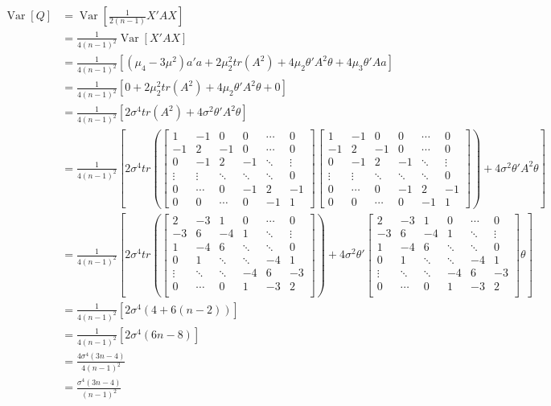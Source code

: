 \documentclass{article}
\newcommand{\Var}{\operatorname{Var}} %
\begin{document}
\begin{align*}
\Var[Q]&= \Var[\frac{1}{2(n-1)}X'AX] \\
&= \frac{1}{4(n-1)^2} \Var[X'AX]\\
&=  \frac{1}{4(n-1)^2} [(\mu_4-3\mu^2) a'a + 2\mu_2^2 tr(A^2) + 4\mu_2 \theta'A^2 \theta + 4\mu_3\theta'Aa] \\
&=  \frac{1}{4(n-1)^2} [0 +  2\mu_2^2 tr(A^2) + 4\mu_2 \theta'A^2 \theta + 0] \\
&=  \frac{1}{4(n-1)^2} [ 2\sigma^4 tr(A^2) + 4\sigma^2 \theta'A^2 \theta] \\
&=  \frac{1}{4(n-1)^2} [ 2\sigma^4 tr(  \begin{bmatrix}
1 & -1 & 0 & 0 & \cdots & 0 \\
-1 & 2 & -1 & 0 & \cdots&0 \\
0 & -1 & 2 & -1 & \ddots &\vdots \\
\vdots & \vdots & \ddots&\ddots &\ddots& 0\\
0&  \cdots & 0 &-1&2&-1 \\
0 & 0& \cdots & 0 & -1&1
\end{bmatrix} \begin{bmatrix}
1 & -1 & 0 & 0 & \cdots & 0 \\
-1 & 2 & -1 & 0 & \cdots&0 \\
0 & -1 & 2 & -1 & \ddots &\vdots \\
\vdots & \vdots & \ddots&\ddots &\ddots& 0\\
0&  \cdots & 0 &-1&2&-1 \\
0 & 0& \cdots & 0 & -1&1
\end{bmatrix})+ 4\sigma^2 \theta'A^2 \theta] \\
&= \frac{1}{4(n-1)^2} [ 2\sigma^4 tr(
\begin{bmatrix}
 2 & -3 & 1 & 0 & \cdots & 0 \\
 -3 & 6 & -4 & 1 & \ddots & \vdots \\
 1 & -4 & 6 & \ddots & \ddots & 0 \\
 0 & 1 & \ddots & \ddots& -4 & 1 \\
 \vdots & \ddots & \ddots & -4 & 6 & -3 \\
 0 & \cdots & 0 & 1 & -3 & 2 \\
\end{bmatrix})+ 4\sigma^2 \theta' 
\begin{bmatrix}
 2 & -3 & 1 & 0 & \cdots & 0 \\
 -3 & 6 & -4 & 1 & \ddots & \vdots \\
 1 & -4 & 6 & \ddots & \ddots & 0 \\
 0 & 1 & \ddots & \ddots& -4 & 1 \\
 \vdots & \ddots & \ddots & -4 & 6 & -3 \\
 0 & \cdots & 0 & 1 & -3 & 2 \\
\end{bmatrix}
 \theta] \\ 
 &= \frac{1}{4(n-1)^2} [ 2\sigma^4 (4+6(n-2)) ] \\
 &= \frac{1}{4(n-1)^2} [2\sigma^4(6n-8)] \\
 &= \frac{4\sigma^4(3n-4)}{4(n-1)^2} \\
 &= \frac{\sigma^4(3n-4)}{(n-1)^2} 
\end{align*}
\end{document}
